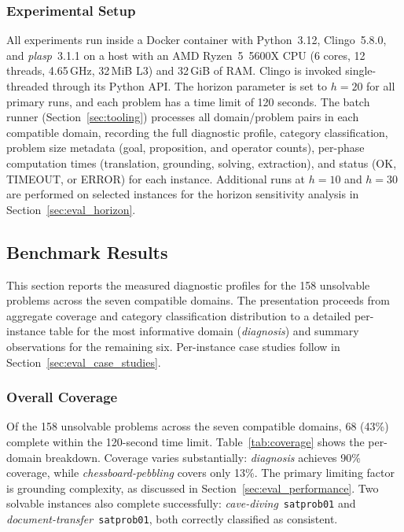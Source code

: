 \subsubsection{Experimental Setup}

All experiments run inside a Docker container with Python~3.12, Clingo~5.8.0, and \textit{plasp}~3.1.1 on a host with an AMD Ryzen~5~5600X CPU (6 cores, 12 threads, 4.65\,GHz, 32\,MiB L3) and 32\,GiB of RAM. Clingo is invoked single-threaded through its Python \ac{API}. The horizon parameter is set to $h = 20$ for all primary runs, and each problem has a time limit of 120 seconds. The batch runner (Section~\ref{sec:tooling}) processes all domain/problem pairs in each compatible domain, recording the full diagnostic profile, category classification, problem size metadata (goal, proposition, and operator counts), per-phase computation times (translation, grounding, solving, extraction), and status (OK, TIMEOUT, or ERROR) for each instance. Additional runs at $h = 10$ and $h = 30$ are performed on selected instances for the horizon sensitivity analysis in Section~\ref{sec:eval_horizon}.

\subsection{Benchmark Results}
\label{sec:eval_results}

This section reports the measured diagnostic profiles for the 158 unsolvable problems across the seven compatible domains. The presentation proceeds from aggregate coverage and category classification distribution to a detailed per-instance table for the most informative domain (\textit{diagnosis}) and summary observations for the remaining six. Per-instance case studies follow in Section~\ref{sec:eval_case_studies}.

\subsubsection{Overall Coverage}

Of the 158 unsolvable problems across the seven compatible domains, 68 (43\%) complete within the 120-second time limit. Table~\ref{tab:coverage} shows the per-domain breakdown. Coverage varies substantially: \textit{diagnosis} achieves 90\% coverage, while \textit{chessboard-pebbling} covers only 13\%. The primary limiting factor is grounding complexity, as discussed in Section~\ref{sec:eval_performance}. Two solvable instances also complete successfully: \textit{cave-diving}~\texttt{satprob01} and \textit{document-transfer}~\texttt{satprob01}, both correctly classified as consistent.

